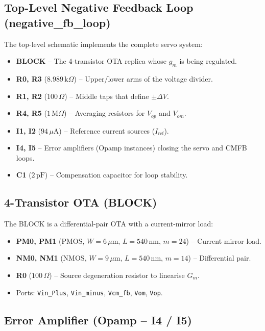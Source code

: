 \documentclass[12pt,a4paper]{article}
\begin{document}
\subsection{Top-Level Negative Feedback Loop (negative\_fb\_loop)}

The top-level schematic implements the complete servo system:

\begin{itemize}[leftmargin=1.5em]
  \item \textbf{BLOCK} -- The 4-transistor OTA replica whose $g_m$ is being regulated.
  \item \textbf{R0, R3} ($8.989\,\text{k}\Omega$) -- Upper/lower arms of the voltage divider.
  \item \textbf{R1, R2} ($100\,\Omega$) -- Middle taps that define $\pm\Delta V$.
  \item \textbf{R4, R5} ($1\,\text{M}\Omega$) -- Averaging resistors for $V_{op}$ and $V_{om}$.
  \item \textbf{I1, I2} ($94\,\mu\text{A}$) -- Reference current sources ($I_{\text{ref}}$).
  \item \textbf{I4, I5} -- Error amplifiers (Opamp instances) closing the servo and CMFB loops.
  \item \textbf{C1} ($2\,\text{pF}$) -- Compensation capacitor for loop stability.
\end{itemize}

\subsection{4-Transistor OTA (BLOCK)}

The BLOCK is a differential-pair OTA with a current-mirror load:

\begin{itemize}[leftmargin=1.5em]
  \item \textbf{PM0, PM1} (PMOS, $W=6\,\mu$m, $L=540\,\text{nm}$, $m=24$) -- Current mirror load.
  \item \textbf{NM0, NM1} (NMOS, $W=9\,\mu$m, $L=540\,\text{nm}$, $m=14$) -- Differential pair.
  \item \textbf{R0} ($100\,\Omega$) -- Source degeneration resistor to linearise $G_m$.
  \item Ports: \texttt{Vin\_Plus}, \texttt{Vin\_minus}, \texttt{Vcm\_fb}, \texttt{Vom}, \texttt{Vop}.
\end{itemize}

\subsection{Error Amplifier (Opamp -- I4 / I5)}
\end{document}
